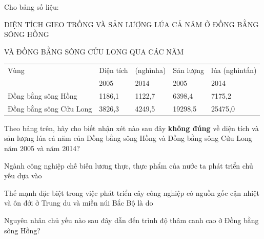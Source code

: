 \documentclass[11pt]{article}
\begin{document}
\begin{vnmultiplechoice}[ rearrange=yes, keycolumns=3]
\begin{question} %
Cho bảng số liệu:\\
\centerline{DIỆN TÍCH GIEO TRỒNG VÀ SẢN LƯỢNG LÚA CẢ NĂM Ở ĐỒNG BẰNG SÔNG HỒNG}
\centerline{VÀ ĐỒNG BẰNG SÔNG CỬU LONG QUA CÁC NĂM}
\begin{center}
\begin{tabular}{| l | l | l | l | l |}\hline
Vùng&Diện tích&(nghìnha)&Sản lượng&lúa (nghìntấn)\\ \cline{2-5}
&2005&2014&2005&2014\\ \hline
Đồng bằng sông Hồng&1186,1&1122,7&6398,4&7175,2\\ \hline
Đồng bằng sông Cửu Long&3826,3&4249,5&19298,5&25475,0\\ \hline
\end{tabular}
\end{center}
Theo bảng trên, hãy cho biết nhận xét nào sau đây \textbf{không đúng} về diện tích và sản lượng lúa cả
năm của Đồng bằng sông Hồng và Đồng bằng sông Cửu Long năm 2005 và năm 2014?
\datcot[4]
\bonpa
{}
{}
{}
{}
\end{question}

\begin{question} %
Ngành công nghiệp chế biến lương thực, thực phẩm của nước ta phát triển chủ yếu dựa vào
\datcot[2]
\bonpa
{}
{}
{}
{}
\end{question}

\begin{question} %
Thế mạnh đặc biệt trong việc phát triển cây công nghiệp có nguồn gốc cận nhiệt và ôn đới ở
Trung du và miền núi Bắc Bộ là do
\datcot[4]
\bonpa
{}
{}
{}
{}
\end{question}

\begin{question} %
Nguyên nhân chủ yếu nào sau đây dẫn đến trình độ thâm canh cao ở Đồng bằng sông Hồng?
\datcot[4]
\bonpa
{}
{}
{}
{}
\end{question}


\end{vnmultiplechoice}
\end{document}
